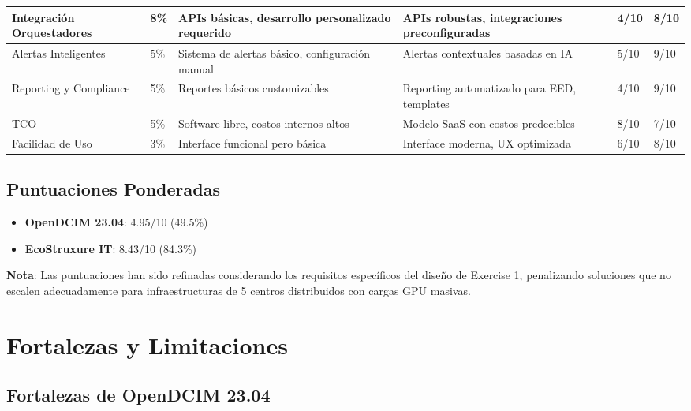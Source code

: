 \documentclass[12pt,a4paper]{article}
\begin{document}
\begin{center}
\begin{longtable}{|p{2.8cm}|p{1.0cm}|p{3.4cm}|p{3.4cm}|p{1.3cm}|p{1.3cm}|}
Integración Orquestadores & 8\% & APIs básicas, desarrollo personalizado requerido & APIs robustas, integraciones preconfiguradas & 4/10 & 8/10 \\
\hline

Alertas Inteligentes & 5\% & Sistema de alertas básico, configuración manual & Alertas contextuales basadas en IA & 5/10 & 9/10 \\
\hline

Reporting y Compliance & 5\% & Reportes básicos customizables & Reporting automatizado para EED, templates & 4/10 & 9/10 \\
\hline

TCO & 5\% & Software libre, costos internos altos & Modelo SaaS con costos predecibles & 8/10 & 7/10 \\
\hline

Facilidad de Uso & 3\% & Interface funcional pero básica & Interface moderna, UX optimizada & 6/10 & 8/10 \\
\hline

\end{longtable}
\end{center}

\subsection{Puntuaciones Ponderadas}

\begin{itemize}
    \item \textbf{OpenDCIM 23.04}: 4.95/10 (49.5\%)
    \item \textbf{EcoStruxure IT}: 8.43/10 (84.3\%)
\end{itemize}

\textbf{Nota}: Las puntuaciones han sido refinadas considerando los requisitos específicos del diseño de Exercise 1, penalizando soluciones que no escalen adecuadamente para infraestructuras de 5 centros distribuidos con cargas GPU masivas.

\section{Fortalezas y Limitaciones}

\subsection{Fortalezas de OpenDCIM 23.04}
\end{document}
